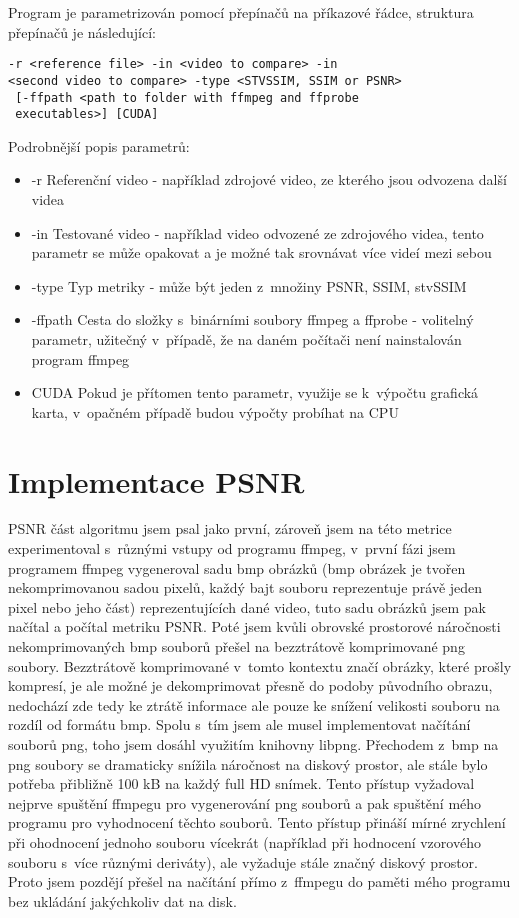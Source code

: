 \documentclass[thesis=M,czech]{FITthesis}[2016/06/26]
\begin{document}
Program je parametrizován pomocí přepínačů na příkazové řádce, struktura přepínačů je následující:
\begin{lstlisting}
-r <reference file> -in <video to compare> -in 
<second video to compare> -type <STVSSIM, SSIM or PSNR>
 [-ffpath <path to folder with ffmpeg and ffprobe 
 executables>] [CUDA]
\end{lstlisting}
Podrobnější popis parametrů:
\begin{itemize}
\item {-r Referenční video - například zdrojové video, ze kterého jsou odvozena další videa}
\item {-in Testované video - například video odvozené ze zdrojového videa, tento parametr se může opakovat a je možné tak srovnávat více videí mezi sebou}
\item {-type Typ metriky - může být jeden z~množiny PSNR, SSIM, stvSSIM}
\item {-ffpath Cesta do složky s~binárními soubory ffmpeg a ffprobe - volitelný parametr, užitečný v~případě, že na daném počítači není nainstalován program ffmpeg}
\item {CUDA Pokud je přítomen tento parametr, využije se k~výpočtu grafická karta, v~opačném případě budou výpočty probíhat na CPU}
\end{itemize}
\section{Implementace PSNR}\label{psnr_implement}
PSNR část algoritmu jsem psal jako první, zároveň jsem na této metrice experimentoval s~různými vstupy od programu ffmpeg, v~první fázi jsem programem ffmpeg vygeneroval sadu bmp obrázků (bmp obrázek je tvořen nekomprimovanou sadou pixelů, každý bajt souboru reprezentuje právě jeden pixel nebo jeho část) reprezentujících dané video, tuto sadu obrázků jsem pak načítal a počítal metriku PSNR. Poté jsem kvůli obrovské prostorové náročnosti nekomprimovaných bmp souborů přešel na bezztrátově komprimované png soubory. Bezztrátově komprimované v~tomto kontextu značí obrázky, které prošly kompresí, je ale možné je dekomprimovat přesně do podoby původního obrazu, nedochází zde tedy ke ztrátě informace ale pouze ke snížení velikosti souboru na rozdíl od formátu bmp. Spolu s~tím jsem ale musel implementovat načítání souborů png, toho jsem dosáhl využitím knihovny libpng. Přechodem z~bmp na png soubory se dramaticky snížila náročnost na diskový prostor, ale stále bylo potřeba přibližně 100 kB na každý full HD snímek. Tento přístup vyžadoval nejprve spuštění ffmpegu pro vygenerování png souborů a pak spuštění mého programu pro vyhodnocení těchto souborů. Tento přístup přináší mírné zrychlení při ohodnocení jednoho souboru vícekrát (například při hodnocení vzorového souboru s~více různými deriváty), ale vyžaduje stále značný diskový prostor. Proto jsem pozdějí přešel na načítání přímo z~ffmpegu do paměti mého programu bez ukládání jakýchkoliv dat na disk.
\end{document}
